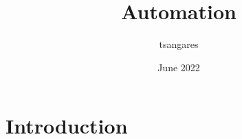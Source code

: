\documentclass{article}
\title{Automation}
\author{tsangares }
\date{June 2022}
\begin{document}
\maketitle

\section{Introduction}
\end{document}
